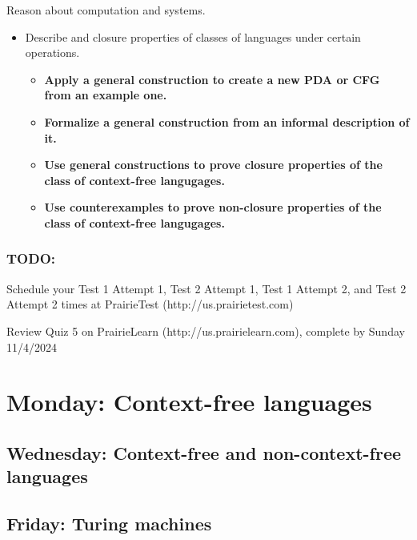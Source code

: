 \begin{itemize}
    Reason about computation and systems.
    \begin{itemize}
        \item Describe and closure properties of classes of languages under certain operations.
        \begin{itemize}
            \item {\bf Apply a general construction to create a new PDA or CFG from an example one.}
            \item {\bf Formalize a general construction from an informal description of it.}
            \item {\bf Use general constructions to prove closure properties of the class of context-free langugages.}
            \item {\bf Use counterexamples to prove non-closure properties of the class of context-free langugages.}
        \end{itemize}
    \end{itemize}
\end{itemize}

\vspace{-20pt}

\subsubsection*{TODO:}
\begin{list}{\itemsep-10pt}
   \item Schedule your Test 1 Attempt 1, Test 2 Attempt 1, Test 1 Attempt 2, and Test 2 Attempt 2 times 
   at PrairieTest (http://us.prairietest.com)
   \item Review Quiz 5 on PrairieLearn (http://us.prairielearn.com), complete by Sunday 11/4/2024
\end{list}

\newpage

\section*{Monday: Context-free languages}


    
\newpage
\subsection*{Wednesday: Context-free and non-context-free languages}




\newpage
\subsection*{Friday: Turing machines}





\newpage
